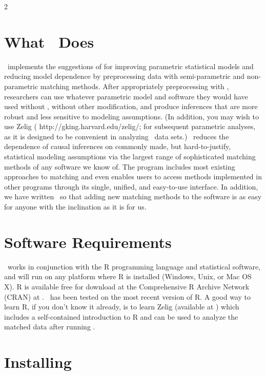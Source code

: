 2
\section{What \MatchIt\ Does}

\MatchIt\ implements the suggestions of \citet*{HoImaKin07} for
improving parametric statistical models and reducing model dependence
by preprocessing data with semi-parametric and non-parametric matching
methods.  After appropriately preprocessing with \MatchIt, researchers
can use whatever parametric model and software they would have used
without \MatchIt, without other modification, and produce inferences
that are more robust and less sensitive to modeling assumptions.  (In
addition, you may wish to use Zelig
(
{http://gking.harvard.edu/zelig/}; \citealt{ImaKinLau06} for
subsequent parametric analyses, as it is designed to be convenient in
analyzing \MatchIt\ data sets.)  \MatchIt\ reduces the dependence of
causal inferences on commonly made, but hard-to-justify, statistical
modeling assumptions via the largest range of sophisticated matching
methods of any software we know of.  The program includes most
existing approaches to matching and even enables users to access
methods implemented in other programs through its single, unified, and
easy-to-use interface.  In addition, we have written \MatchIt\ so
that adding new matching methods to the software is as easy for anyone
with the inclination as it is for us.

\section{Software Requirements} 
\label{sec:require}

\MatchIt\ works in conjunction with the R programming language and
statistical software, and will run on any platform where R is
installed (Windows, Unix, or Mac OS X).  R is available free for
download at the Comprehensive R Archive Network (CRAN) at
.
\MatchIt\ has been tested on the most recent version of R.  A good way
to learn R, if you don't know it already, is to learn Zelig (available
at
)
which includes a self-contained introduction to R and can be used to
analyze the matched data after running \MatchIt.

\section{Installing \MatchIt}
\label{sec:install}

